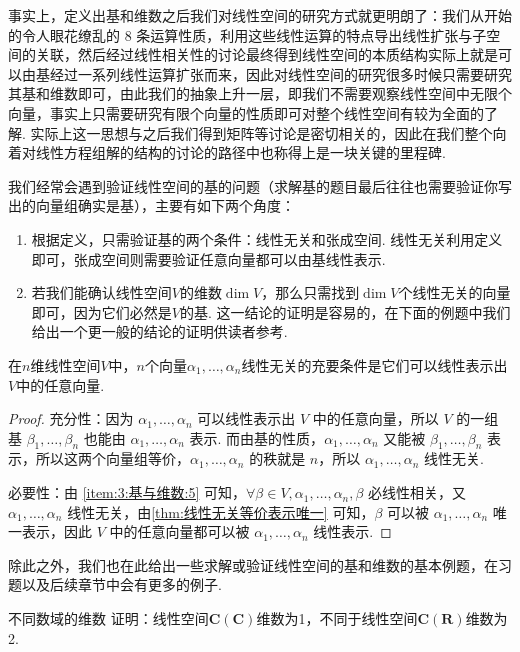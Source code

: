 事实上，定义出基和维数之后我们对线性空间的研究方式就更明朗了：我们从开始的令人眼花缭乱的 8 条运算性质，利用这些线性运算的特点导出线性扩张与子空间的关联，然后经过线性相关性的讨论最终得到线性空间的本质结构实际上就是可以由基经过一系列线性运算扩张而来，因此对线性空间的研究很多时候只需要研究其基和维数即可，由此我们的抽象上升一层，即我们不需要观察线性空间中无限个向量，事实上只需要研究有限个向量的性质即可对整个线性空间有较为全面的了解. 实际上这一思想与之后我们得到矩阵等讨论是密切相关的，因此在我们整个向着对线性方程组解的结构的讨论的路径中也称得上是一块关键的里程碑.

我们经常会遇到验证线性空间的基的问题（求解基的题目最后往往也需要验证你写出的向量组确实是基），主要有如下两个角度：
\begin{enumerate}
    \item 根据定义，只需验证基的两个条件：线性无关和张成空间. 线性无关利用定义即可，张成空间则需要验证任意向量都可以由基线性表示.

    \item 若我们能确认线性空间$V$的维数$\dim V$，那么只需找到$\dim V$个线性无关的向量即可，因为它们必然是$V$的基. 这一结论的证明是容易的，在下面的例题中我们给出一个更一般的结论的证明供读者参考.
\end{enumerate}

\begin{example}{}{}
    在$n$维线性空间$V$中，$n$个向量$\alpha_1,\ldots,\alpha_n$线性无关的充要条件是它们可以线性表示出$V$中的任意向量.
\end{example}

\begin{proof}
    充分性：因为 $\alpha_1,\ldots,\alpha_n$ 可以线性表示出 $V$ 中的任意向量，所以 $V$ 的一组基 $\beta_1, \ldots, \beta_n$ 也能由 $\alpha_1,\ldots,\alpha_n$ 表示. 而由基的性质，$\alpha_1,\ldots,\alpha_n$ 又能被 $\beta_1, \ldots, \beta_n$ 表示，所以这两个向量组等价，$\alpha_1,\ldots,\alpha_n$ 的秩就是 $n$，所以 $\alpha_1,\ldots,\alpha_n$ 线性无关.

    必要性：由 \ref*{item:3:基与维数:5} 可知，$\forall \beta \in V, \alpha_1, \ldots, \alpha_n, \beta$ 必线性相关，又 $\alpha_1,\ldots,\alpha_n$ 线性无关，由\autoref{thm:线性无关等价表示唯一} 可知，$\beta$ 可以被 $\alpha_1,\ldots,\alpha_n$ 唯一表示，因此 $V$ 中的任意向量都可以被 $\alpha_1,\ldots,\alpha_n$ 线性表示.
\end{proof}

除此之外，我们也在此给出一些求解或验证线性空间的基和维数的基本例题，在习题以及后续章节中会有更多的例子.
\begin{example}{}{不同数域的维数}
    证明：线性空间$\mathbf{C}(\mathbf{C})$维数为1，不同于线性空间$\mathbf{C}(\mathbf{R})$维数为2.
\end{example}

